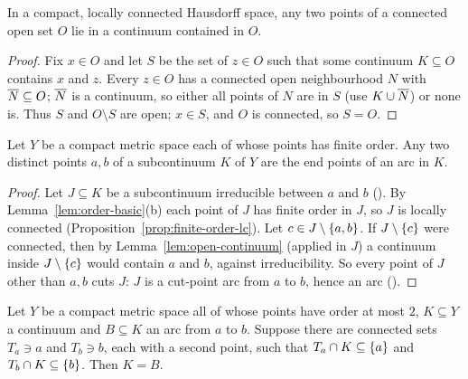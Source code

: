 
\begin{lemma}\label{lem:open-continuum}
In a compact, locally connected Hausdorff space, any two points of a connected open set $O$ lie in a continuum
contained in $O$.
\end{lemma}

\begin{proof}
Fix $x\in O$ and let $S$ be the set of $z\in O$ such that some continuum $K\subseteq O$ contains $x$ and $z$. Every $z\in O$ has a
connected open neighbourhood $N$ with $\overline{N}\subseteq O$; $\overline{N}$ is a continuum, so either all points of $N$ are in $S$ (use
$K\cup\overline{N}$) or none is. Thus $S$ and $O\setminus S$ are open; $x\in S$, and $O$ is connected, so $S=O$.
\end{proof}


\begin{proposition}\label{prop:finite-order-arcs}
Let $Y$ be a compact metric space each of whose points has finite order. Any two distinct points $a,b$ of a
subcontinuum $K$ of $Y$ are the end points of an arc in $K$.
\end{proposition}

\begin{proof}
Let $J\subseteq K$ be a subcontinuum irreducible between $a$ and $b$ (). By Lemma~\ref{lem:order-basic}(b) each
point of $J$ has finite order in $J$, so $J$ is locally connected (Proposition~\ref{prop:finite-order-lc}). Let $c\in
J\setminus\left\{ a,b \right\}$. If $J\setminus\left\{ c \right\}$ were connected, then by Lemma~\ref{lem:open-continuum} (applied in $J$) a continuum
inside $J\setminus\left\{ c \right\}$ would contain $a$ and $b$, against irreducibility. So every point of $J$ other than $a,b$ cuts $J$: $J$ is a
cut-point arc from $a$ to $b$, hence an arc ().
\end{proof}


\begin{lemma}\label{lem:legs}
Let $Y$ be a compact metric space all of whose points have order at most $2$, $K\subseteq Y$ a continuum and $B\subseteq K$ an arc
from $a$ to $b$. Suppose there are connected sets $T_a\ni a$ and $T_b\ni b$, each with a second point, such that $T_a\cap
K\subseteq\left\{ a \right\}$ and $T_b\cap K\subseteq\left\{ b \right\}$. Then $K=B$.
\end{lemma}

